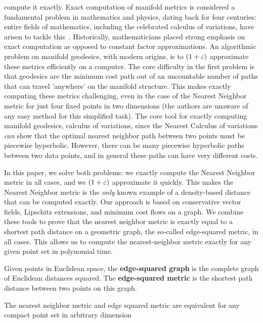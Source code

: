 compute it exactly. Exact computation of manifold metrics is considered a
fundamental problem in mathematics and physics, dating back for four
centuries: entire fields of mathematics, including the celebrated calculus
of variations, have arisen to tackle this~\cite{}. Historically,
mathematicians placed strong emphasis on exact computation as opposed to
constant factor approximations. An algorithmic problem on manifold
geodesics, with modern origins, is to $(1+\varepsilon)$ approximate these metrics
efficiently on a computer. The core difficulty in the first problem is that
geodesics are the minimum cost path out of an uncountable number of paths
that can travel 'anywhere' on the manifold structure. This makes exactly
computing these metrics challenging, even in the case of the Nearest
Neighbor metric for just four fixed points in two dimensions (the authors
are unaware of any easy method for this simplified task). The core tool for
exactly computing manifold geodesics, calculus of variations, since the
Nearest Calculus of variations \textit{can} show that the optimal nearest
neighbor path between two points must be piecewise hyperbolic. However,
there can be many piecewise hyperbolic paths between two data points, and
in general these paths can have very different costs. 


In this paper, we solve both problems: we exactly compute the Nearest
Neighbor metric in all cases, and we $(1+\varepsilon)$ approximate it quickly.
This makes the Nearest Neighbor metric is the \textit{only} known example
of a density-based distance that can be computed exactly.  Our approach is
based on conservative vector fields, Lipschitz extensions, and minimum cost
flows on a graph. We combine these tools to prove that the nearest neighbor
metric is exactly equal to a shortest path distance on a geometric graph,
the so-called edge-squared metric, in all cases. This allows us to compute
the nearest-neighbor metric exactly for any given point set in polynomial
time.


\begin{definition} Given points in Euclidean space, the
\textbf{edge-squared graph} is the complete graph of Euclidean distances
squared. The \textbf{edge-squared metric} is the shortest path distance
between two points on this graph. \end{definition}

\begin{theorem}\label{thm:NN} The nearest neighbor metric and edge squared
metric are equivalent for any compact point set in arbitrary dimension
\end{theorem}

